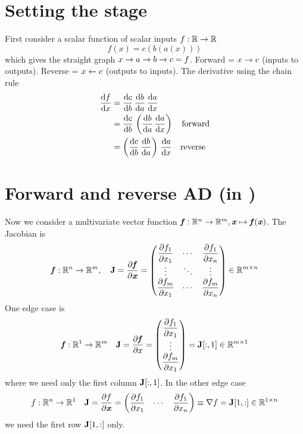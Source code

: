 \documentclass[paper=a4,11pt,headsepline]{scrartcl}
\begin{document}
\section{Setting the stage}
%
First consider a scalar function of scalar inputs $f:\mathbb R\rightarrow\mathbb R$
\begin{equation*}
    f(x) = c(b(a(x)))
\end{equation*}
which gives the straight graph $x\rightarrow a\rightarrow b\rightarrow c = f$. Forward = $x \rightarrow c$ (inputs
to outputs). Reverse = $x \leftarrow c$ (outputs to inputs).
The derivative using the chain rule
\begin{align*}
    \dfrac{\text{d} f}{\text{d} x}
        &= \dfrac{\text{d} c}{\text{d} b}\,\dfrac{\text{d} b}{\text{d} a}\,\dfrac{\text{d} a}{\text{d} x}\\
        &= \dfrac{\text{d} c}{\text{d} b}\,\left(\dfrac{\text{d} b}{\text{d} a}\,\dfrac{\text{d} a}{\text{d} x}\right)\quad\text{forward}\\
        &= \left(\dfrac{\text{d} c}{\text{d} b}\,\dfrac{\text{d} b}{\text{d} a}\right)\,\dfrac{\text{d} a}{\text{d} x}\quad\text{reverse}\\
\end{align*}

\section{Forward and reverse AD (in \jax)}

Now we consider a multivariate vector function $\bm{\mathit{f}}: \mathbb R^n \rightarrow \mathbb
R^m, \bm{\mathit{x}}\mapsto \bm{\mathit{f}}(\bm{\mathit{x}})$. The Jacobian is
\begin{equation*}
    \bm{\mathit{f}}: \mathbb R^n \rightarrow \mathbb R^m,\quad \bm{\mathbf{J}}
    = \dfrac{\partial \bm{\mathit{f}}}{\partial \bm{\mathit{x}}} =
    \begin{pmatrix}
        \dfrac{\partial f_1}{\partial x_1} & \cdots & \dfrac{\partial f_1}{\partial x_n}  \\
        \vdots        & \ddots & \vdots         \\
        \dfrac{\partial f_m}{\partial x_1} & \cdots & \dfrac{\partial f_m}{\partial x_n}
    \end{pmatrix}
    \in\mathbb R^{m\times n}
\end{equation*}
One edge case is
\begin{equation*}
    \bm{\mathit{f}}: \mathbb R^1 \rightarrow \mathbb R^m\quad \bm{\mathbf{J}}
    = \dfrac{\partial \bm{\mathit{f}}}{\partial x} =
    \begin{pmatrix}
        \dfrac{\partial f_1}{\partial x_1}  \\
        \vdots         \\
        \dfrac{\partial f_m}{\partial x_1}
    \end{pmatrix}
    = \bm{\mathbf{J}}[:,1]\in\mathbb R^{m\times 1}
\end{equation*}
where we need only the first column $\bm{\mathbf{J}}[:,1]$. In the other edge case
\begin{equation*}
    f: \mathbb R^n \rightarrow \mathbb R^1\quad \bm{\mathbf{J}}
    = \dfrac{\partial f}{\partial \bm{\mathit{x}}} =
    \begin{pmatrix}
        \dfrac{\partial f_1}{\partial x_1} & \cdots & \dfrac{\partial f_1}{\partial x_n}
    \end{pmatrix} \equiv \nabla f
    = \bm{\mathbf{J}}[1,:] \in\mathbb R^{1\times n}
\end{equation*}
we need the first row $\bm{\mathbf{J}}[1,:]$ only.
\end{document}
